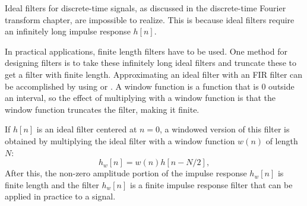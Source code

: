 Ideal filters for discrete-time signals, as discussed in the
discrete-time Fourier transform chapter, are impossible to
realize. This is because ideal filters require an infinitely long
impulse response $h[n]$.

In practical applications, finite length filters have to be used.
One method for designing filters is to take these infinitely
long ideal filters and truncate these to get a filter with finite length.
Approximating an ideal filter with an FIR filter can be accomplished by using \emph{} or \emph{}.
A window function is a function that is $0$ outside an interval,
so the effect of multiplying with a window function is that the window
function truncates the filter, making it finite.

If $h[n]$ is an ideal filter centered at $n=0$, a windowed version of
this filter is obtained by multiplying the ideal filter with a window
function $w(n)$ of length $N$:
\begin{equation}
  h_{w}[n] = w(n)h[n-N/2],
  \label{eq:windowed_filter}
\end{equation}
After this, the non-zero amplitude portion of the impulse response
$h_{w}[n]$ is finite length and the filter $h_w[n]$ is a finite impulse
response filter that can be applied in practice to a signal.

